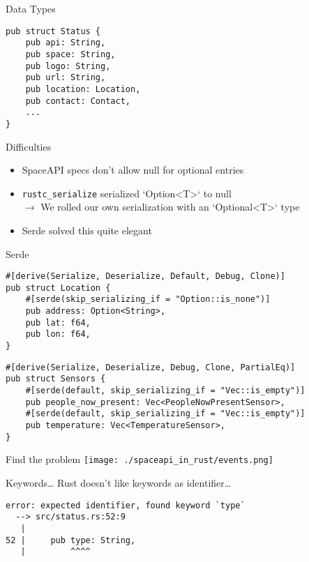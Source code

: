 \begin{frame}[fragile]{Data Types}
    \begin{verbatim}
pub struct Status {
    pub api: String,
    pub space: String,
    pub logo: String,
    pub url: String,
    pub location: Location,
    pub contact: Contact,
    ...
}
    \end{verbatim}
\end{frame}

\begin{frame}[c]{Difficulties}
    \begin{itemize}
        \item SpaceAPI specs don't allow null for optional entries
        \item \texttt{rustc\_serialize} serialized `Option<T>` to null \\
            \pause$\rightarrow$ We rolled our own serialization with an `Optional<T>` type
        \item Serde solved this quite elegant
    \end{itemize}
\end{frame}

\begin{frame}[fragile]{Serde}
    \begin{verbatim}
#[derive(Serialize, Deserialize, Default, Debug, Clone)]
pub struct Location {
    #[serde(skip_serializing_if = "Option::is_none")]
    pub address: Option<String>,
    pub lat: f64,
    pub lon: f64,
}
    \end{verbatim}
    \pause\begin{verbatim}
#[derive(Serialize, Deserialize, Debug, Clone, PartialEq)]
pub struct Sensors {
    #[serde(default, skip_serializing_if = "Vec::is_empty")]
    pub people_now_present: Vec<PeopleNowPresentSensor>,
    #[serde(default, skip_serializing_if = "Vec::is_empty")]
    pub temperature: Vec<TemperatureSensor>,
}
    \end{verbatim}
\end{frame}

\begin{frame}[fragile]{Find the problem}
    \texttt{[image: ./spaceapi\_in\_rust/events.png]}
\end{frame}

\begin{frame}[c,fragile]{Keywords\ldots}
    Rust doesn't like keywords as identifier\ldots
    \begin{verbatim}
error: expected identifier, found keyword `type`
  --> src/status.rs:52:9
   |
52 |     pub type: String,
   |         ^^^^
    \end{verbatim}
\end{frame}

